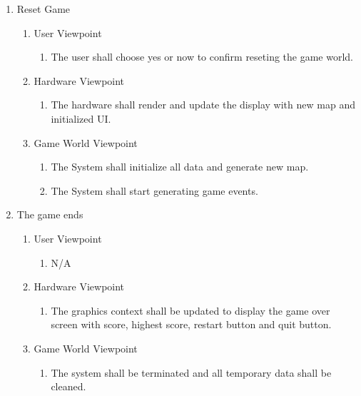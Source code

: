 \documentclass[]{article}
\begin{document}
\begin{enumerate}[{BE}1.]
\begin{enumerate}[{VP7}.1]
\begin{enumerate}
			\end{enumerate}
	\end{enumerate}
		\item Reset Game
	\begin{enumerate}[{VP9}.1]
		\item User Viewpoint
			\begin{enumerate}
				\item The user shall choose yes or now to confirm reseting the game world.
			\end{enumerate}
		\item Hardware Viewpoint
			\begin{enumerate}
				\item The hardware shall render and update the display with new map and initialized UI.
			\end{enumerate}
		\item Game World Viewpoint
			\begin{enumerate}
				\item The System shall initialize all data and generate new map.
				\item The System shall start generating game events.
			\end{enumerate}
			
	\end{enumerate}
		\item The game ends
	\begin{enumerate}[{VP9}.1]
		\item User Viewpoint
			\begin{enumerate}
				\item N/A
			\end{enumerate}
		\item Hardware Viewpoint
			\begin{enumerate}
				\item The graphics context shall be updated to display the game over screen with score, highest score, restart button and quit button.
				\end{enumerate}
		\item Game World Viewpoint
			\begin{enumerate}
				\item The system shall be terminated and all temporary data shall be cleaned.
			\end{enumerate}			
	\end{enumerate}
	
\end{enumerate}
\end{document}
